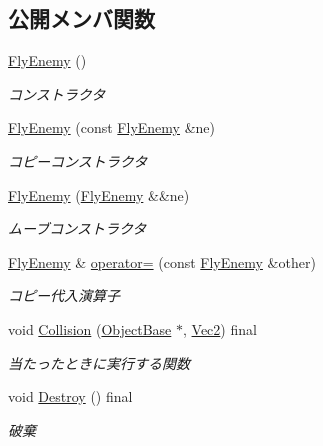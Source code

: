 \subsection*{公開メンバ関数}
\begin{DoxyCompactItemize}
\item 
\mbox{\hyperlink{class_fly_enemy_a92bb66e1f877440afab15a36ffebd74d}{Fly\+Enemy}} ()
\begin{DoxyCompactList}\small\item\em コンストラクタ \end{DoxyCompactList}\item 
\mbox{\hyperlink{class_fly_enemy_af206898a5e1b59cc7bba2e4c13b72384}{Fly\+Enemy}} (const \mbox{\hyperlink{class_fly_enemy}{Fly\+Enemy}} \&ne)
\begin{DoxyCompactList}\small\item\em コピーコンストラクタ \end{DoxyCompactList}\item 
\mbox{\hyperlink{class_fly_enemy_ad32ad41958e55f3028b0beb068813bc1}{Fly\+Enemy}} (\mbox{\hyperlink{class_fly_enemy}{Fly\+Enemy}} \&\&ne)
\begin{DoxyCompactList}\small\item\em ムーブコンストラクタ \end{DoxyCompactList}\item 
\mbox{\hyperlink{class_fly_enemy}{Fly\+Enemy}} \& \mbox{\hyperlink{class_fly_enemy_a6cc3f3701b503020620c02667705fd23}{operator=}} (const \mbox{\hyperlink{class_fly_enemy}{Fly\+Enemy}} \&other)
\begin{DoxyCompactList}\small\item\em コピー代入演算子 \end{DoxyCompactList}\item 
void \mbox{\hyperlink{class_fly_enemy_a90b7b82f93094aaee9069daafe319a2b}{Collision}} (\mbox{\hyperlink{class_object_base}{Object\+Base}} $\ast$, \mbox{\hyperlink{common_8h_ae148fff5818e9444b4ab2288829559bf}{Vec2}}) final
\begin{DoxyCompactList}\small\item\em 当たったときに実行する関数 \end{DoxyCompactList}\item 
void \mbox{\hyperlink{class_fly_enemy_af7ce5137e8eb2e8cc6654fbbdbc714cd}{Destroy}} () final
\begin{DoxyCompactList}\small\item\em 破棄 \end{DoxyCompactList}\item 

\end{DoxyCompactItemize}
